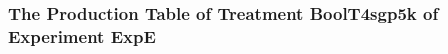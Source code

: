  \begin{frame}
 \fontsize{8pt}{9pt}\selectfont
 \frametitle{ The Production Table of Treatment BoolT4sgp5k of Experiment ExpE }

 \label{ExpEGrammarTable005.tex}  
 \end{frame}

